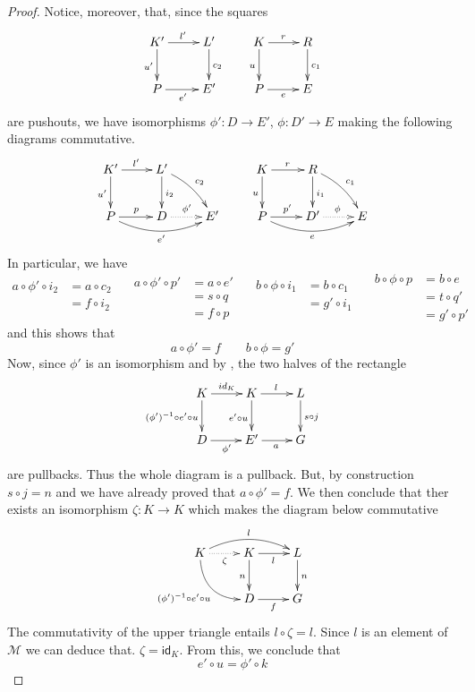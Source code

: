 \documentclass[a4paper,UKenglish,cleveref,pdftex, thm-restate,numberwithinsect]{lipics}
\newcommand{\id}[1]{\mathsf{id}_{#1}}
\def\D{\textbf {\textup{D}}}
\begin{document}
\begin{proof}
	Notice, moreover, that, since the squares
	\[\xymatrix{K' \ar[d]_{u'} \ar[r]^{l'}& L' \ar[d]^{c_2} & K \ar[r]^{r}\ar[d]_{u} & R \ar[d]^{c_1}\\ P \ar[r]_{e'} & E' & P\ar[r]_e & E}\]
	are pushouts, we have isomorphisms  $\phi'\colon D\to E'$, $\phi\colon D'\to E$ making the following diagrams commutative.
	\[\xymatrix{K' \ar[d]_{u'} \ar[r]^{l'}& L'\ar[d]^{i_2}  \ar@/^.2cm/[dr]^{c_2} & &K \ar[r]^{r}\ar[d]_{u} & R \ar[d]^{i_1} \ar@/^.2cm/[dr]^{c_1}\\ P \ar@/_.4cm/[rr]_{e'}\ar[r]^{p} & D\ar@{.>}[r]^{\phi'} &E'& P\ar@/_.4cm/[rr]_{e}\ar[r]^{p'} & D'\ar@{.>}[r]^{\phi}& E}\]
	In particular, we have
	\[\begin{split}
		a\circ \phi' \circ i_2&=a \circ c_2\\&=f\circ i_2\\&
	\end{split}\quad \begin{split}
	a\circ \phi' \circ p'&=a \circ e'\\&=s\circ q\\&=f\circ p
	\end{split}\quad \begin{split}
	b\circ \phi \circ i_1&=b \circ c_1\\&=g'\circ i_1\\&
	\end{split}\quad \begin{split}
	b\circ \phi \circ p&=b \circ e\\&=t\circ q'\\&=g'\circ p'
	\end{split} \]
	and this shows that 
	\[a\circ \phi'=f \qquad b\circ \phi = g'\]
	Now, since $\phi'$ is an isomorphism and by , the two halves of the rectangle
	\[\xymatrix{K\ar[r]^{\id{K}} \ar[d]_{(\phi')^{-1} \circ e' \circ u}&K\ar[d]_{e'\circ u} \ar[r]^{l} & L \ar[d]^{s\circ j} \\D\ar[r]_{\phi'} & E' \ar[r]_{a}&G}\]
	are pullbacks. Thus the whole diagram is a pullback. But, by construction $s\circ j =n$ and we have already proved that $a\circ \phi'=f$. We then conclude that ther exists an isomorphism $\zeta\colon K\to K$ which makes the diagram below commutative
	\[\xymatrix{K \ar@{.>}[r]_{\zeta}\ar@/^.4cm/[rr]^{l}  \ar@/_.5cm/[dr]_{(\phi')^{-1} \circ e' \circ u}& K \ar[r]_{l} \ar[d]_{n} & L \ar[d]^{n} \\ & D \ar[r]_{f} & G}\]
	The commutativity of the upper triangle entails $l\circ \zeta=l$. Since $l$ is an element of $\mathcal{M}$  we can deduce that. $\zeta=\id{K}$. From this, we conclude that
	\[e'\circ u = \phi' \circ k\]
	

\end{proof}
\end{document}
